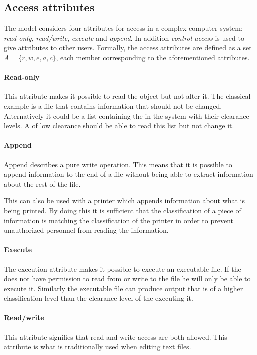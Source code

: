 \subsection{Access attributes}\label{blp:access_attributes}
The model considers four attributes for access in a complex computer system: \emph{read-only}, \emph{read/write}, \emph{execute} and \emph{append}.
In addition \emph{control access} is used to give attributes to other users.
Formally, the access attributes are defined as a set $A = \{ r, w, e, a, c \}$, each member corresponding to the aforementioned attributes.

\paragraph{Read-only}
This attribute makes it possible to read the object but not alter it.
The classical example is a file that contains information that should not be changed.
Alternatively it could be a list containing the \principals{} in the system with their clearance levels.
A \principal{} of low clearance should be able to read this list but not change it.

\paragraph{Append}
Append describes a pure write operation.
This means that it is possible to append information to the end of a file without being able to extract information about the rest of the file.

This can also be used with a printer which appends information about what is being printed.
By doing this it is sufficient that the classification of a piece of information is matching the classification of the printer in order to prevent unauthorized personnel from reading the information.

\paragraph{Execute}
The execution attribute makes it possible to execute an executable file.
If the \principal{} does not have permission to read from or write to the file he will only be able to execute it.
Similarly the executable file can produce output that is of a higher classification level than the clearance level of the \principal{} executing it.

\paragraph{Read/write}
This attribute signifies that read and write access are both allowed.
This attribute is what is traditionally used when editing text files.


